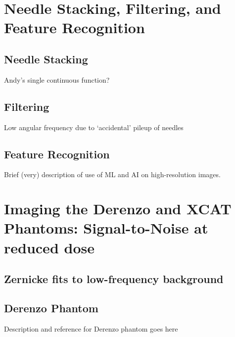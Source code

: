 \documentclass[12pt]{article}
\begin{document}
\section{Needle Stacking, Filtering, and Feature Recognition}
\subsection{Needle Stacking}
Andy's single continuous function?
\subsection{Filtering}
Low angular frequency due to `accidental' pileup of needles
\subsection{Feature Recognition}
Brief (very) description of use of ML and AI on high-resolution images.

\section{Imaging the Derenzo and XCAT Phantoms: Signal-to-Noise at reduced dose}
\label{Imaging_phantoms}

\subsection{Zernicke fits to low-frequency background}
\label{Zernicke_fits}

\subsection{Derenzo Phantom}
\label{Derenzo_phantom}
Description and reference for Derenzo phantom goes here
\end{document}
